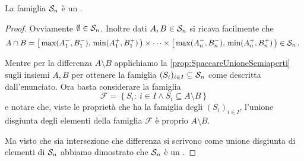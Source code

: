 \begin{lemma}\label{lemma:SemianelloSemiAperti}
	La famiglia $\S_n$ è un \semiring{}.
\end{lemma}
\begin{proof}
	Ovviamente $\emptyset\in\S_n$.
	Inoltre dati $A,B\in\S_n$ si ricava facilmente che
	\begin{equation*}
		A\cap B=\co{\max(A^-_1,B^-_1)}{\min(A^+_1,B^+_1)}\times\cdots\times\co{\max(A^-_n,B^-_n)}{\min(A^+_n,B^+_n)}\in\S_n \punto
	\end{equation*}

	Mentre per la differenza $A\setminus B$ applichiamo la \cref{prop:SpaccareUnioneSemiaperti} sugli insiemi $A,B$ per ottenere la famiglia $(S_i)_{i\in I}\subseteq \S_n$ come descritta dall'enunciato.
	Ora basta considerare la famiglia
	\begin{equation*}
		\mathcal F=\left\{S_i:\ i\in I\wedge S_i\subseteq A\setminus B\right\}
	\end{equation*}
	e notare che, viste le proprietà che ha la famiglia degli $(S_i)_{i\in I}$, l'unione disgiunta degli elementi della famiglia $\mathcal F$ è proprio $A\setminus B$.
	
	Ma visto che sia intersezione che differenza si scrivono come unione disgiunta di elementi di $\S_n$ abbiamo dimostrato che $\S_n$ è un \semiring{}.
\end{proof}

